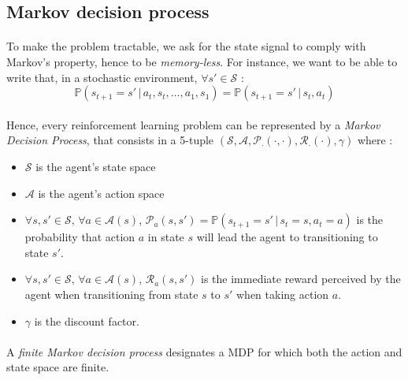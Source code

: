\documentclass[a4paper]{report}
\begin{document}
{{{				%
			}
			\subsection{Markov decision process}
			{
				\paragraph{} To make the problem tractable, we ask for the state signal to comply with Markov's property, hence to be \emph{memory-less}. For instance, we want to be able to write that, in a stochastic environment, $\forall s'\in\mathcal{S}$ : 
				\begin{equation}
					\mathbb{P}\left( s_{t+1}=s' \, \vert \, a_t, s_t, \hdots, a_1,s_1\right) = \mathbb{P}\left( s_{t+1}=s' \, \vert \, s_t, a_t\right)
				\end{equation}
				
				\paragraph{} Hence, every reinforcement learning problem can be represented by a \emph{Markov Decision Process}, that consists in a 5-tuple $\left(\mathcal{S}, \mathcal{A}, \mathcal{P}_{\cdot}(\cdot,\cdot), \mathcal{R}_{\cdot}(\cdot), \gamma \right)$ where : 
				\begin{itemize}[label=$\triangleright$]
					\item $\mathcal{S}$ is the agent's state space
					\item $\mathcal{A}$ is the agent's action space
					\item $\forall s,s'\in\mathcal{S}, \, \forall a\in\mathcal{A}(s)$,  $\mathcal{P}_a(s,s') = \mathbb{P}(s_{t+1}=s'\, \vert \, s_t = s, a_t = a)$ is the probability that action $a$ in state $s$ will lead the agent to transitioning to state $s'$.
					\item $\forall s,s'\in\mathcal{S}, \, \forall a\in\mathcal{A}(s)$,  $\mathcal{R}_a(s,s')$ is the immediate reward perceived by the agent when transitioning from state $s$ to $s'$ when taking action $a$. 
					\item $\gamma$ is the discount factor. 
				\end{itemize}
				
				\paragraph{} A \emph{finite Markov decision process} designates a MDP for which both the action and state space are finite. 
			}
}}
\end{document}
